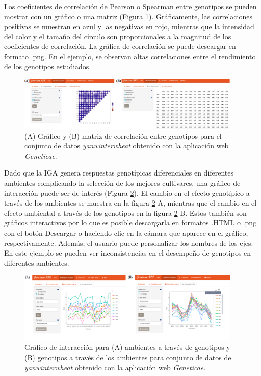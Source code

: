 Los coeficientes de correlación de Pearson o Spearman entre genotipos se pueden mostrar con un gráfico o una matriz (Figura \ref{fig:figdesc2}). Gráficamente, las correlaciones positivas se muestran en azul y las negativas en rojo, mientras que la intensidad del color y el tamaño del círculo son proporcionales a la magnitud de los coeficientes de correlación. La gráfica de correlación se puede descargar en formato .png. En el ejemplo, se observan altas correlaciones entre el rendimiento de los genotipos estudiados. 

\begin{figure}[h]
	\begin{center}
		\includegraphics[width=0.95\textwidth]{./Graficos/www/correlacion.png}
	\end{center}
	\caption{(A) Gráfico y (B) matriz de correlación entre genotipos para el conjunto de datos \emph{yanwinterwheat} obtenido con la aplicación web \emph{Geneticae}.}
	\label{fig:figdesc2}
\end{figure}


Dado que la IGA genera respuestas genotípicas diferenciales en diferentes ambientes complicando la selección de los mejores cultivares, una gráfico de interacción puede ser de interés (Figura \ref{fig:figdesc3}). El cambio en el efecto genotípico a través de los ambientes se muestra en la figura \ref{fig:figdesc3} A, mientras que el cambio en el efecto ambiental a través de los genotipos en la figura \ref{fig:figdesc3} B. Estos también son gráficos interactivos por lo que es posible descargarla en formatos .HTML o .png con el botón Descargar o haciendo clic en la cámara que aparece en el gráfico, respectivamente. Además, el usuario puede personalizar los nombres de los ejes. En este ejemplo se pueden ver inconsistencias en el desempeño de genotipos en diferentes ambientes. 


\begin{figure}[h]
	\begin{center}
		\includegraphics[width=0.95\textwidth]{./Graficos/www/interaction.png}
	\end{center}
	\caption{Gráfico de interacción para (A) ambientes a través de genotipos y (B) genotipos a través de los ambientes para conjunto de datos de \emph{yanwinterwheat} obtenido con la aplicación web \emph{Geneticae}.}
	\label{fig:figdesc3}
\end{figure}


